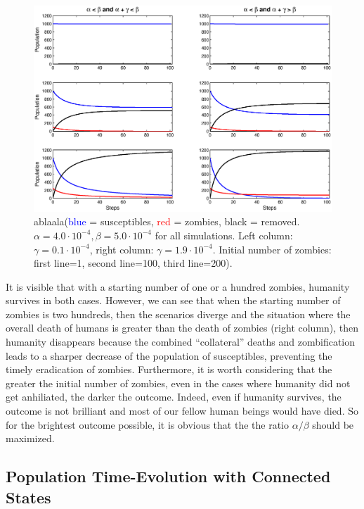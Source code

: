 \documentclass[11pt]{article} %
\begin{document}
\begin{figure}[h!]
\centerline{
\includegraphics[scale=0.55]{../images/Matlab_figures/model-AltB.eps}}
\caption{ablaala(\textcolor{blue}{blue} = susceptibles, \textcolor{red}{red} = zombies, black = removed. $\alpha=4.0\cdot10^{-4}, \beta=5.0\cdot10^{-4}$ for all simulations. Left column: $\gamma=0.1\cdot10^{-4}$, right column: $\gamma=1.9\cdot10^{-4}$. Initial number of zombies: first line=1, second line=100, third line=200). \label{gamma_population} }
\end{figure}

It is visible that with a starting number of one or a hundred zombies, humanity survives in both cases. However, we can see that when the starting number of zombies is two hundreds, then the scenarios diverge and the situation where the overall death of humans is greater than the death of zombies (right column), then humanity disappears because the combined ``collateral''  deaths and zombification leads to a sharper decrease of the population of susceptibles, preventing the timely eradication of zombies. Furthermore, it is worth considering that the greater the initial number of zombies, even in the cases where humanity did not get anhiliated, the darker the outcome. Indeed, even if humanity survives, the outcome is not brilliant and most of our fellow human beings would have died. So for the brightest outcome possible, it is obvious that the the ratio $\alpha/\beta$ should be maximized.


\subsection{Population Time-Evolution with Connected States}\indent
 
\end{document}
